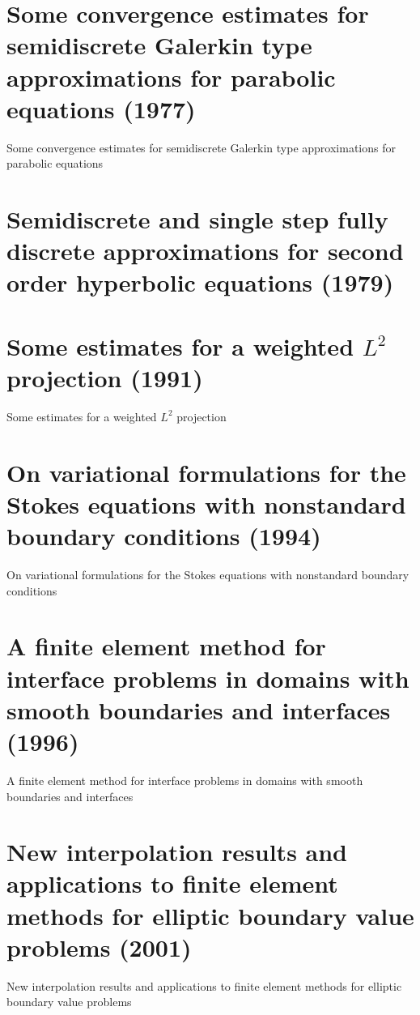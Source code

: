 \section{Some convergence estimates for semidiscrete Galerkin type approximations for parabolic equations (1977)}
Some convergence estimates for semidiscrete Galerkin type approximations for parabolic equations\cite{bramble1977some}



\section{Semidiscrete and single step fully discrete approximations for second order hyperbolic equations (1979)}
\cite{baker1979semidiscrete}



\section{Some estimates for a weighted $L^2$ projection (1991)}
Some estimates for a weighted $L^2$ projection\cite{bramble1991some}


\section{On variational formulations for the Stokes equations with nonstandard boundary conditions (1994)}
On variational formulations for the Stokes equations with nonstandard boundary conditions\cite{bramble1994variational}



\section{A finite element method for interface problems in domains with smooth boundaries and interfaces (1996)}
A finite element method for interface problems in domains with smooth boundaries and interfaces\cite{bramble1996finite}




\section{New interpolation results and applications to finite element methods for elliptic boundary value problems (2001)}
New interpolation results and applications to finite element methods for elliptic boundary value problems\cite{bacuta2001new}



